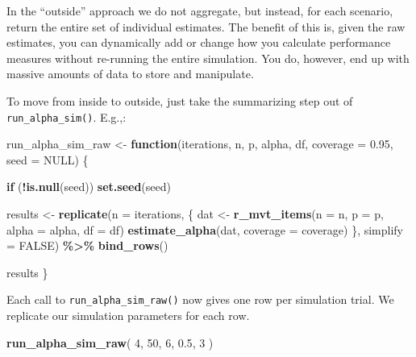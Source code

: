 \documentclass[
]{book}
\newenvironment{Shaded}{\begin{snugshade}}{\end{snugshade}}
\newcommand{\AttributeTok}[1]{\textcolor[rgb]{0.13,0.29,0.53}{#1}}
\newcommand{\ConstantTok}[1]{\textcolor[rgb]{0.56,0.35,0.01}{#1}}
\newcommand{\ControlFlowTok}[1]{\textcolor[rgb]{0.13,0.29,0.53}{\textbf{#1}}}
\newcommand{\DecValTok}[1]{\textcolor[rgb]{0.00,0.00,0.81}{#1}}
\newcommand{\FloatTok}[1]{\textcolor[rgb]{0.00,0.00,0.81}{#1}}
\newcommand{\FunctionTok}[1]{\textcolor[rgb]{0.13,0.29,0.53}{\textbf{#1}}}
\newcommand{\NormalTok}[1]{#1}
\newcommand{\OtherTok}[1]{\textcolor[rgb]{0.56,0.35,0.01}{#1}}
\newcommand{\SpecialCharTok}[1]{\textcolor[rgb]{0.81,0.36,0.00}{\textbf{#1}}}
\begin{document}
In the ``outside'' approach we do not aggregate, but instead, for each scenario, return the entire set of individual estimates.
The benefit of this is, given the raw estimates, you can dynamically add or change how you calculate performance measures without re-running the entire simulation.
You do, however, end up with massive amounts of data to store and manipulate.

To move from inside to outside, just take the summarizing step out of \texttt{run\_alpha\_sim()}.
E.g.,:

\begin{Shaded}
\begin{Highlighting}[]
\NormalTok{run\_alpha\_sim\_raw }\OtherTok{\textless{}{-}} \ControlFlowTok{function}\NormalTok{(iterations, n, p, alpha, df, }\AttributeTok{coverage =} \FloatTok{0.95}\NormalTok{, }\AttributeTok{seed =} \ConstantTok{NULL}\NormalTok{) \{}
  
  \ControlFlowTok{if}\NormalTok{ (}\SpecialCharTok{!}\FunctionTok{is.null}\NormalTok{(seed)) }\FunctionTok{set.seed}\NormalTok{(seed)}
  
\NormalTok{  results }\OtherTok{\textless{}{-}} 
    \FunctionTok{replicate}\NormalTok{(}\AttributeTok{n =}\NormalTok{ iterations, \{}
\NormalTok{      dat }\OtherTok{\textless{}{-}} \FunctionTok{r\_mvt\_items}\NormalTok{(}\AttributeTok{n =}\NormalTok{ n, }\AttributeTok{p =}\NormalTok{ p, }\AttributeTok{alpha =}\NormalTok{ alpha, }\AttributeTok{df =}\NormalTok{ df)}
      \FunctionTok{estimate\_alpha}\NormalTok{(dat, }\AttributeTok{coverage =}\NormalTok{ coverage)}
\NormalTok{    \}, }\AttributeTok{simplify =} \ConstantTok{FALSE}\NormalTok{) }\SpecialCharTok{\%\textgreater{}\%}
    \FunctionTok{bind\_rows}\NormalTok{()}
  
\NormalTok{  results}
\NormalTok{\}}
\end{Highlighting}
\end{Shaded}

Each call to \texttt{run\_alpha\_sim\_raw()} now gives one row per simulation trial.
We replicate our simulation parameters for each row.

\begin{Shaded}
\begin{Highlighting}[]
\FunctionTok{run\_alpha\_sim\_raw}\NormalTok{( }\DecValTok{4}\NormalTok{, }\DecValTok{50}\NormalTok{, }\DecValTok{6}\NormalTok{, }\FloatTok{0.5}\NormalTok{, }\DecValTok{3}\NormalTok{ )}
\end{Highlighting}
\end{Shaded}
\end{document}
